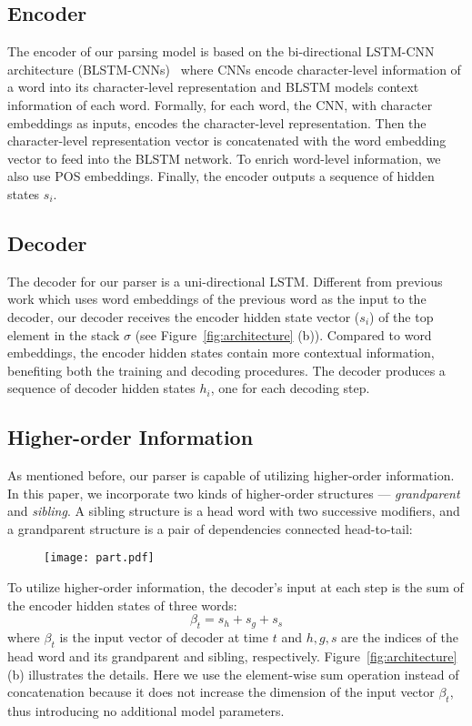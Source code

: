 \documentclass[11pt,a4paper]{article}
\begin{document}
\subsection{Encoder}\label{subsec:encoder}
The encoder of our parsing model is based on the bi-directional LSTM-CNN architecture (BLSTM-CNNs)~\citep{TACL792,ma-hovy:2016:P16-1} where CNNs encode character-level information of a word into its character-level representation and BLSTM models context information of each word. 
Formally, for each word, the CNN, with character embeddings as inputs, encodes the character-level representation. 
Then the character-level representation vector is concatenated with the word embedding vector to feed into the BLSTM network.
To enrich word-level information, we also use POS embeddings.
Finally, the encoder outputs a sequence of hidden states $s_i$.

\subsection{Decoder}\label{subsec:decoder}
The decoder for our parser is a uni-directional LSTM. Different from previous work \citep{bahdanau2015,vinyals2015pointer} which uses word embeddings of the previous word as the input to the decoder, our decoder receives the encoder hidden state vector ($s_i$) of the top element in the stack $\sigma$ (see Figure~\ref{fig:architecture} (b)).
Compared to word embeddings, the encoder hidden states contain more contextual information, benefiting both the training and decoding procedures. 
The decoder produces a sequence of decoder hidden states $h_i$, one for each decoding step.

\subsection{Higher-order Information}\label{subsec:higher-order}
As mentioned before, our parser is capable of utilizing higher-order information.
In this paper, we incorporate two kinds of higher-order structures --- \emph{grandparent} and \emph{sibling}.
A sibling structure is a head word with two successive modifiers, and a grandparent structure is a pair of dependencies connected head-to-tail:
\begin{figure}[h]
\centering
\texttt{[image: part.pdf]}
\end{figure}

To utilize higher-order information, the decoder's input at each step is the sum of the encoder hidden states of three words:
\begin{displaymath}
\beta_t = s_h + s_g + s_s
\end{displaymath}
where $\beta_t$ is the input vector of decoder at time $t$ and $h, g, s$ are the indices of the head word and its grandparent and sibling, respectively. 
Figure~\ref{fig:architecture} (b) illustrates the details.
Here we use the element-wise sum operation instead of concatenation because it does not increase the dimension of the input vector $\beta_t$, thus introducing no additional model parameters.
\end{document}

